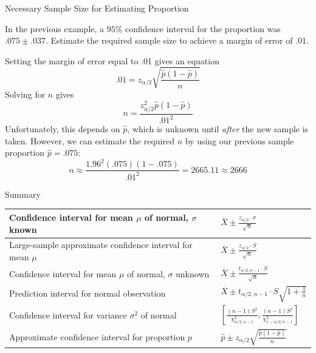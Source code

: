 \documentclass[t,handout]{beamer}
\begin{document}
    \begin{frame}{Necessary Sample Size for Estimating Proportion}
    \begin{block}{}
    In the previous example, a $95\%$ confidence interval for the proportion was $.075 \pm .037$. Estimate the required sample size to achieve a margin of error of .01.
    \end{block}
    \pause Setting the margin of error equal to .01 gives an equation
    $$.01=z_{\alpha/2}\sqrt{\frac{\hat p(1-\hat p)}n}$$
    \pause Solving for $n$ gives
    $$n=\frac{z_{\alpha/2}^2\hat p(1-\hat p)}{.01^2}$$
    \pause Unfortunately, this depends on $\hat p$, which is unknown until \textit{after} the new sample is taken. \pause However, we can estimate the required $n$ by using our previous sample proportion $\hat p = .075$:
    \pause
    $$n \approx \frac{1.96^2(.075)(1-.075)}{.01^2}=2665.11 \approx 2666$$
    \end{frame}
    
    
    
    
    \begin{frame}{Summary}
    \begin{center}
    \small
    \renewcommand*{\arraystretch}{1.5}
    \begin{tabular}{p{4.5cm}|p{4cm}}
    Confidence interval for mean $\mu$ of normal, $\sigma$ known & 
    \vspace{-.25cm}$\displaystyle\overline X \pm \frac{z_{\alpha/2}\cdot\sigma}{\sqrt n}$ \\ \hline
    Large-sample approximate confidence interval for mean $\mu$ & 
    \vspace{-.25cm}$\displaystyle\overline{X} \pm \frac{z_{\alpha/2}\cdot S}{\sqrt{n}}$ \\ \hline
    Confidence interval for mean $\mu$ of normal, $\sigma$ unknown & \vspace{-.25cm}$\displaystyle\overline{X} \pm \frac{t_{\alpha/2,n-1}\cdot S}{\sqrt{n}}$ \\ \hline
    Prediction interval for normal observation & 
    \vspace{-.25cm}$\displaystyle\overline X \pm t_{\alpha/2,n-1}\cdot S\sqrt{1+\frac1n}$ \\ \hline
    Confidence interval for variance $\sigma^2$ of normal &
    \vspace{-.35cm}$\displaystyle\left[\frac{(n-1)S^2}{\chi^2_{\alpha/2,n-1}}, \frac{(n-1)S^2}{\chi^2_{1-\alpha/2,n-1}}\right]$ \\ \hline
    Approximate confidence interval for proportion $p$ &
    \vspace{-.3cm}$\displaystyle\hat p \pm z_{\alpha/2}\sqrt{\frac{\hat p(1-\hat p)}n}$
    \end{tabular}
    \end{center}
    \end{frame}
\end{document}
